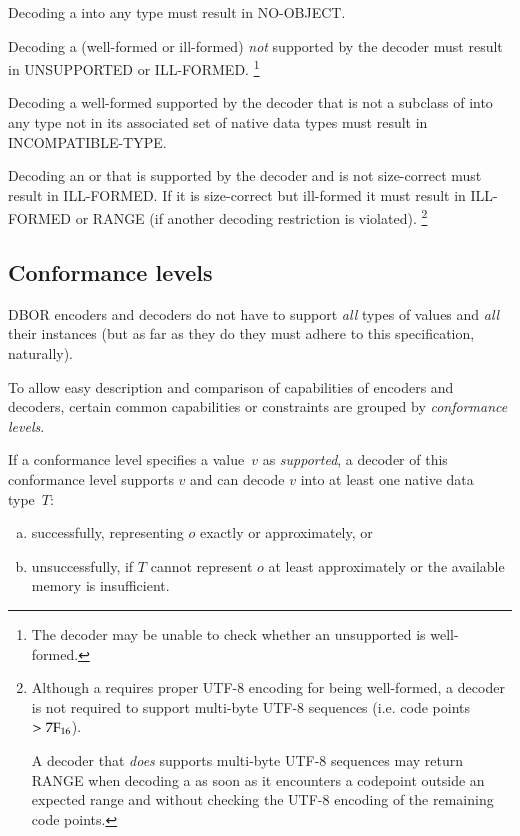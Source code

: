 Decoding a \DborNoneValue{} into any type must result in NO-OBJECT\@.

\medskip
Decoding a (well-formed or ill-formed) \DborValue{} \emph{not} supported by the decoder
must result in UNSUPPORTED or ILL-FORMED.%
\footnote{%
    The decoder may be unable to check whether an unsupported \DborValue{} is well-formed.
}

\medskip
Decoding a well-formed \DborValue{} supported by the decoder that is not a subclass of \DborNumberValue{}
into any type not in its associated set of native data types must result in INCOMPATIBLE-TYPE\@.

\medskip
Decoding an \DborContainerValue{} or \DborUtfEightStringValue{} that is supported by the decoder and
is not size-correct must result in ILL-FORMED\@.
If it is size-correct but ill-formed it must result in ILL-FORMED or RANGE
(if another decoding restriction is violated).%
\footnote{%
    Although a \DborUtfEightStringValue{} requires proper UTF-8 encoding for being well-formed,
    a decoder is not required to support multi-byte UTF-8 sequences (i.e. code points $> \mathrm{7F}_{16}$).

    A decoder that \emph{does} supports multi-byte UTF-8 sequences
    may return RANGE when decoding a \DborUtfEightStringValue{} as soon as it encounters a codepoint outside
    an expected range and without checking the UTF-8 encoding of the remaining code points.
}


\subsection{Conformance levels}
\label{sec:conformancelevels}

DBOR encoders and decoders do not have to support \emph{all} types of values and \emph{all} their instances
(but as far as they do they must adhere to this specification, naturally).

To allow easy description and comparison of capabilities of encoders and decoders,
certain common capabilities or constraints are grouped by \emph{conformance levels}.

\medskip
If a conformance level specifies a value~$v$ as \emph{supported},
a decoder of this conformance level supports $v$ and can decode $v$ into at least one native data type~$T$:
\begin{enumerate}[a)]
    \item
    successfully, representing $o$ exactly or approximately, or

    \item
    unsuccessfully, if $T$ cannot represent $o$ at least approximately or
    the available memory is insufficient.
\end{enumerate}

